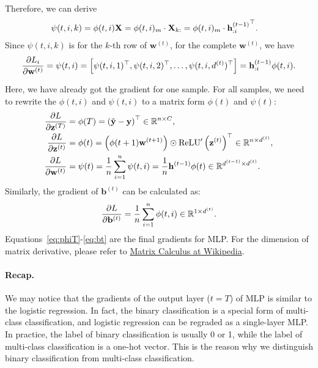 \documentclass{article}
\begin{document}
Therefore, we can derive
\begin{align}
    \psi(t, i, k) &= \phi(t, i)\mathbf{X} = \phi(t, i)_m \cdot \mathbf{X}_{k:} = \phi(t, i)_m \cdot {\mathbf{h}^{(t - 1)}_{:i}}^\top. \notag
\end{align}
Since $\psi(t, i, k)$ is for the $k$-th row of $\mathbf{w}^{(t)}$, for the complete $\mathbf{w}^{(t)}$, we have
\begin{align}
    \frac{\partial L_{i}}{\partial{\mathbf{w}^{(t)}}} = \psi(t, i) = \left[\psi(t, i, 1)^\top, \psi(t, i, 2)^\top, \dots, \psi(t, i, d^{(t)})^\top\right] = \mathbf{h}^{(t - 1)}_{:i}\phi(t, i). \notag
\end{align}

Here, we have already got the gradient for one sample. For all samples, we need to rewrite the $\phi(t, i)$ and $\psi(t, i)$ to a matrix form $\phi(t)$ and $\psi(t)$:
\begin{align}
    \frac{\partial L}{\partial\mathbf{z}^{(T)}} &= \phi(T) = \left(\hat{\mathbf{y}} - \mathbf{y}\right)^\top \in \mathbb{R}^{n \times C}, \label{eq:phiT} \\
    \frac{\partial L}{\partial\mathbf{z}^{(t)}} &= \phi(t) = \left(\phi(t + 1)\mathbf{w}^{(t + 1)}\right) \odot \text{ReLU}'\left(\mathbf{z}^{(t)}\right)^\top \label{eq:phit} \in \mathbb{R}^{n \times d^{(t)}}, \\
    \frac{\partial L}{\partial\mathbf{w}^{(t)}} &= \psi(t) = \frac{1}{n}\sum_{i = 1}^{n}{\psi(t, i)} = \frac{1}{n}\mathbf{h}^{(t - 1)}\phi(t) \in \mathbb{R}^{d^{(t - 1)} \times d^{(t)}}. \label{eq:psit}
\end{align}
Similarly, the gradient of $\mathbf{b}^{(t)}$ can be calculated as:
\begin{align}
    \frac{\partial L}{\partial\mathbf{b}^{(t)}} = \frac{1}{n}\sum_{i = 1}^{n}{\phi(t, i)} \in \mathbb{R}^{1 \times d^{(t)}}. \label{eq:bt}
\end{align}
Equations~\eqref{eq:phiT}-\eqref{eq:bt} are the final gradients for MLP. For the dimension of matrix derivative, please refer to \href{https://en.wikipedia.org/wiki/Matrix_calculus}{Matrix Calculus at Wikipedia}.

\paragraph{Recap.} We may notice that the gradients of the output layer ($t = T$) of MLP is similar to the logistic regression. In fact, the binary classification is a special form of multi-class classification, and logistic regression can be regraded as a single-layer MLP. In practice, the label of binary classification is usually 0 or 1, while the label of multi-class classification is a one-hot vector. This is the reason why we distinguish binary classification from multi-class classification.
\end{document}
